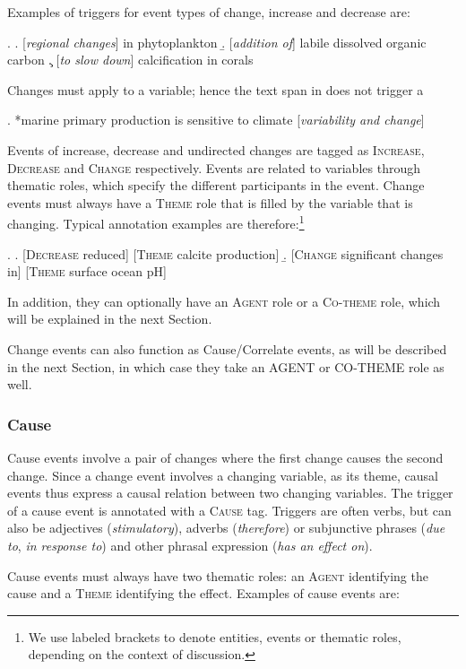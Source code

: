\documentclass[10pt, a4paper]{article}
\newcommand{\tag}[1]{\textsc{#1}}
\begin{document}
Examples of triggers for event types of change, increase and decrease are:

\ex.
  \a. [\emph{regional changes}] in phytoplankton
  \b. [\emph{addition of}] labile dissolved organic carbon
  \c. [\emph{to slow down}] calcification in corals

Changes must apply to a variable; hence the text span in \Next does not trigger a

\ex. *marine primary production is sensitive to climate [\emph{variability and change}]

Events of increase, decrease and undirected changes are tagged as \tag{Increase}, \tag{Decrease} and \tag{Change} respectively. 
Events are related to variables through thematic roles, which specify the different participants in the event. 
Change events must always have a \tag{Theme} role that is filled by the variable that is changing.
Typical annotation examples are therefore:\footnote{We use labeled brackets to denote entities, events or thematic roles, depending on the context of discussion.}

\exi.
  \a. [\tag{Decrease} reduced] [\tag{Theme} calcite production]
  \b. [\tag{Change} significant changes in] [\tag{Theme} surface ocean pH]

In addition, they can optionally have an \tag{Agent} role or a \tag{Co-theme} role, which will be explained in the next Section.

Change events can also function as Cause/Correlate events, as will be described in the next Section, in which case they take an AGENT or CO-THEME role as well.


\subsubsection{Cause}

Cause events involve a pair of changes where the first change causes the second change.
Since a change event involves a changing variable, as its theme, causal events thus express a causal relation between two changing variables. 
The trigger of a cause event is annotated with a \tag{Cause} tag.
Triggers are often verbs, but can also be adjectives (\emph{stimulatory}), adverbs (\emph{therefore}) or subjunctive phrases (\emph{due to}, \emph{in response to}) and other phrasal expression (\emph{has an effect on}).  

Cause events must always have two thematic roles: an \tag{Agent} identifying the cause and a \tag{Theme} identifying the effect. 
Examples of cause events are:
\end{document}
